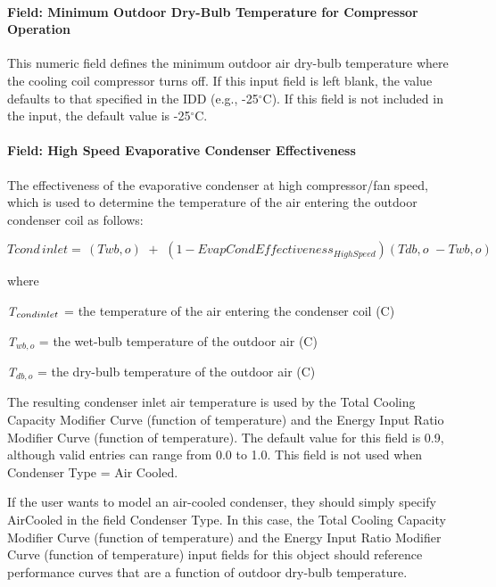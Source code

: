 \paragraph{Field: Minimum Outdoor Dry-Bulb Temperature for Compressor Operation}

This numeric field defines the minimum outdoor air dry-bulb temperature where the cooling coil compressor turns off. If this input field is left blank, the value defaults to that specified in the IDD (e.g., -25$^\circ$C). If this field is not included in the input, the default value is -25$^\circ$C.

\paragraph{Field: High Speed Evaporative Condenser Effectiveness}\label{field-high-speed-evaporative-condenser-effectiveness}

The effectiveness of the evaporative condenser at high compressor/fan speed, which is used to determine the temperature of the air entering the outdoor condenser coil as follows:

\begin{equation}
Tcond\,inlet = \,\left( {Twb,o} \right)\,\, + \,\,\left( {1 - EvapCondEffectivenes{s_{HighSpeed}}} \right)\left( {Tdb,o\,\, - Twb,o} \right)
\end{equation}

where

\emph{T\(_{cond\\ inlet}\)} = the temperature of the air entering the condenser coil (C)

\emph{T\(_{wb,o}\)} = the wet-bulb temperature of the outdoor air (C)

\emph{T\(_{db,o}\)} = the dry-bulb temperature of the outdoor air (C)

The resulting condenser inlet air temperature is used by the Total Cooling Capacity Modifier Curve (function of temperature) and the Energy Input Ratio Modifier Curve (function of temperature). The default value for this field is 0.9, although valid entries can range from 0.0 to 1.0. This field is not used when Condenser Type = Air Cooled.

If the user wants to model an air-cooled condenser, they should simply specify AirCooled in the field Condenser Type. In this case, the Total Cooling Capacity Modifier Curve (function of temperature) and the Energy Input Ratio Modifier Curve (function of temperature) input fields for this object should reference performance curves that are a function of outdoor dry-bulb temperature.

